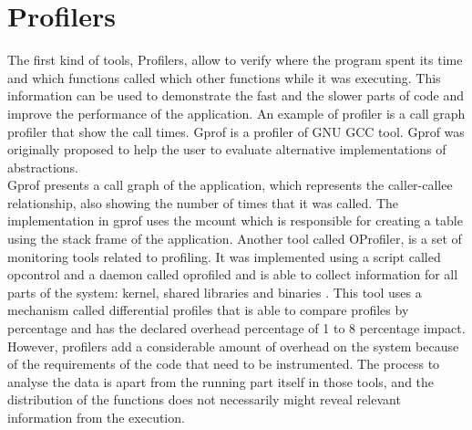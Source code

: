 \section{Profilers}
The first kind of tools, Profilers, allow to verify where the program spent its time and which functions called which other functions while it was executing. This information can be used to demonstrate the fast and the slower parts of code and improve the performance of the application.
An example of profiler is a call graph profiler that show the call times. Gprof is a profiler of GNU GCC tool. Gprof was originally proposed to help the user to evaluate alternative implementations of abstractions.\\
Gprof presents a call graph of the application, which represents the caller-callee relationship, also showing the number of times that it was called. The implementation in gprof uses the mcount which is responsible for creating a table using the stack frame of the application.
Another tool called OProfiler, is a set of monitoring tools related to profiling. It was implemented using a script called opcontrol and a daemon called oprofiled and is able to collect information for all parts of the system: kernel, shared libraries and binaries \cite{oprofile}. This tool uses a mechanism called differential profiles that is able to compare profiles by percentage and has the declared overhead percentage of 1 to 8 percentage impact.\\
However, profilers add a considerable amount of overhead on the system because of the requirements of the code that need to be instrumented. The process to analyse the data is apart from the running part itself in those tools, and the distribution of the functions does not necessarily might reveal relevant information from the execution.\\
